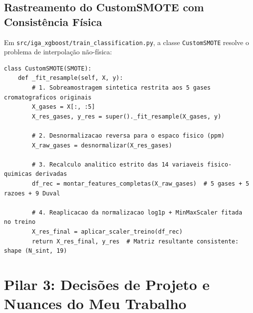 \documentclass[11pt,a4paper]{article}
\begin{document}
\subsection{Rastreamento do CustomSMOTE com Consistência Física}
Em \texttt{src/iga\_xgboost/train\_classification.py}, a classe \texttt{CustomSMOTE} resolve o problema de interpolação não-física:

\begin{lstlisting}
class CustomSMOTE(SMOTE):
    def _fit_resample(self, X, y):
        # 1. Sobreamostragem sintetica restrita aos 5 gases cromatograficos originais
        X_gases = X[:, :5]
        X_res_gases, y_res = super()._fit_resample(X_gases, y)
        
        # 2. Desnormalizacao reversa para o espaco fisico (ppm)
        X_raw_gases = desnormalizar(X_res_gases)
        
        # 3. Recalculo analitico estrito das 14 variaveis fisico-quimicas derivadas
        df_rec = montar_features_completas(X_raw_gases)  # 5 gases + 5 razoes + 9 Duval
        
        # 4. Reaplicacao da normalizacao log1p + MinMaxScaler fitada no treino
        X_res_final = aplicar_scaler_treino(df_rec)
        return X_res_final, y_res  # Matriz resultante consistente: shape (N_sint, 19)
\end{lstlisting}

\vspace{0.4cm}
\section{Pilar 3: Decisões de Projeto e Nuances do Meu Trabalho}
\end{document}
